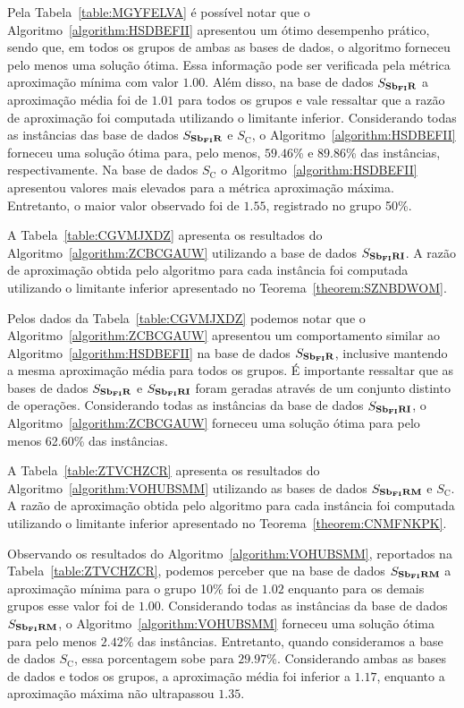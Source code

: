 Pela Tabela~\ref{table:MGYFELVA} é possível notar que o Algoritmo~\ref{algorithm:HSDBEFII} apresentou um ótimo desempenho prático, sendo que, em todos os grupos de ambas as bases de dados, o algoritmo forneceu pelo menos uma solução ótima. Essa informação pode ser verificada pela métrica aproximação mínima com valor $1.00$. Além disso, na base de dados $S_{\textbf{Sb\textsubscript{FI}R}}{}$ a aproximação média foi de $1.01$ para todos os grupos e vale ressaltar que a razão de aproximação foi computada utilizando o limitante inferior. Considerando todas as instâncias das base de dados $S_{\textbf{Sb\textsubscript{FI}R}}{}$ e $S_{\text{C}}$, o Algoritmo~\ref{algorithm:HSDBEFII} forneceu uma solução ótima para, pelo menos, $59.46$\% e $89.86$\% das instâncias, respectivamente. Na base de dados $S_{\text{C}}$ o Algoritmo~\ref{algorithm:HSDBEFII} apresentou valores mais elevados para a métrica aproximação máxima. Entretanto, o maior valor observado foi de $1.55$, registrado no grupo 50\%.

A Tabela~\ref{table:CGVMJXDZ} apresenta os resultados do Algoritmo~\ref{algorithm:ZCBCGAUW} utilizando a base de dados $S_{\textbf{Sb\textsubscript{FI}RI}}{}$. A razão de aproximação obtida pelo algoritmo para cada instância foi computada utilizando o limitante inferior apresentado no Teorema~\ref{theorem:SZNBDWOM}.



Pelos dados da Tabela~\ref{table:CGVMJXDZ} podemos notar que o Algoritmo~\ref{algorithm:ZCBCGAUW} apresentou um comportamento similar ao Algoritmo~\ref{algorithm:HSDBEFII} na base de dados $S_{\textbf{Sb\textsubscript{FI}R}}{}$, inclusive mantendo a mesma aproximação média para todos os grupos. É importante ressaltar que as bases de dados $S_{\textbf{Sb\textsubscript{FI}R}}{}$ e $S_{\textbf{Sb\textsubscript{FI}RI}}{}$ foram geradas através de um conjunto distinto de operações. Considerando todas as instâncias da base de dados $S_{\textbf{Sb\textsubscript{FI}RI}}{}$, o Algoritmo~\ref{algorithm:ZCBCGAUW} forneceu uma solução ótima para pelo menos 62.60\% das instâncias.

A Tabela~\ref{table:ZTVCHZCR} apresenta os resultados do Algoritmo~\ref{algorithm:VOHUBSMM} utilizando as bases de dados $S_{\textbf{Sb\textsubscript{FI}RM}}{}$ e $S_{\text{C}}$. A razão de aproximação obtida pelo algoritmo para cada instância foi computada utilizando o limitante inferior apresentado no Teorema~\ref{theorem:CNMFNKPK}.



Observando os resultados do Algoritmo~\ref{algorithm:VOHUBSMM}, reportados na Tabela~\ref{table:ZTVCHZCR}, podemos perceber que na base de dados $S_{\textbf{Sb\textsubscript{FI}RM}}{}$ a aproximação mínima para o grupo 10\% foi de $1.02$ enquanto para os demais grupos esse valor foi de $1.00$. Considerando todas as instâncias da base de dados $S_{\textbf{Sb\textsubscript{FI}RM}}{}$, o Algoritmo~\ref{algorithm:VOHUBSMM} forneceu uma solução ótima para pelo menos $2.42$\% das instâncias. Entretanto, quando consideramos a base de dados $S_{\text{C}}$, essa porcentagem sobe para $29.97$\%. Considerando ambas as bases de dados e todos os grupos, a aproximação média foi inferior a $1.17$, enquanto a aproximação máxima não ultrapassou $1.35$.


